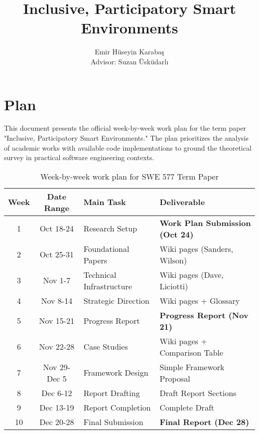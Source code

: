 \documentclass[a4paper,oneside,12pt]{report}
\title{Inclusive, Participatory Smart Environments}
\author{Emir Hüseyin Karabaş \\ Advisor: Suzan Üsküdarlı}
\begin{document}
\maketitle{}
\tableofcontents

\chapter{Plan}

This document presents the official week-by-week work plan for the term paper "Inclusive, Participatory Smart Environments." The plan prioritizes the analysis of academic works with available code implementations to ground the theoretical survey in practical software engineering contexts.

\vspace{1cm}

\begin{table}[h!]
\begin{center}
\small
\begin{tabularx}{\textwidth}{|c|c|>{\raggedright\arraybackslash}X|>{\raggedright\arraybackslash}X|}
\hline 
\bf{Week} & \bf{Date Range} & \bf{Main Task} & \bf{Deliverable} \\
\hline
1 & Oct 18-24 & Research Setup & \bf{Work Plan Submission (Oct 24)} \\
\hline
2 & Oct 25-31 & Foundational Papers & 2 Wiki pages (Sanders, Wilson) \\
\hline
3 & Nov 1-7 & Technical Infrastructure & 2 Wiki pages (Dave, Liciotti) \\
\hline
4 & Nov 8-14 & Strategic Direction & 2 Wiki pages + Glossary \\
\hline
5 & Nov 15-21 & Progress Report & \bf{Progress Report (Nov 21)} \\
\hline
6 & Nov 22-28 & Case Studies & 3 Wiki pages + Comparison Table \\
\hline
7 & Nov 29-Dec 5 & Framework Design & Simple Framework Proposal \\
\hline
8 & Dec 6-12 & Report Drafting & Draft Report Sections \\
\hline
9 & Dec 13-19 & Report Completion & Complete Draft \\
\hline
10 & Dec 20-28 & Final Submission & \bf{Final Report (Dec 28)} \\
\hline
\end{tabularx}
\end{center}
\caption{Week-by-week work plan for SWE 577 Term Paper}
\label{tab:workplan}
\end{table}
\end{document}
